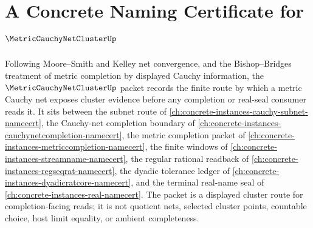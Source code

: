 \chapter{A Concrete Naming Certificate for $\MetricCauchyNetClusterUp$}
\label{ch:concrete-instances-metric-cauchy-net-cluster-namecert}

Following Moore--Smith and Kelley net convergence, and the Bishop--Bridges treatment of metric completion by displayed Cauchy information, the $\MetricCauchyNetClusterUp$ packet records the finite route by which a metric Cauchy net exposes cluster evidence before any completion or real-seal consumer reads it. It sits between the subnet route of \autoref{ch:concrete-instances-cauchy-subnet-namecert}, the Cauchy-net completion boundary of \autoref{ch:concrete-instances-cauchynetcompletion-namecert}, the metric completion packet of \autoref{ch:concrete-instances-metriccompletion-namecert}, the finite windows of \autoref{ch:concrete-instances-streamname-namecert}, the regular rational readback of \autoref{ch:concrete-instances-regseqrat-namecert}, the dyadic tolerance ledger of \autoref{ch:concrete-instances-dyadicratcore-namecert}, and the terminal real-name seal of \autoref{ch:concrete-instances-real-namecert}. The packet is a displayed cluster route for completion-facing reads; it is not quotient nets, selected cluster points, countable choice, host limit equality, or ambient completeness.

